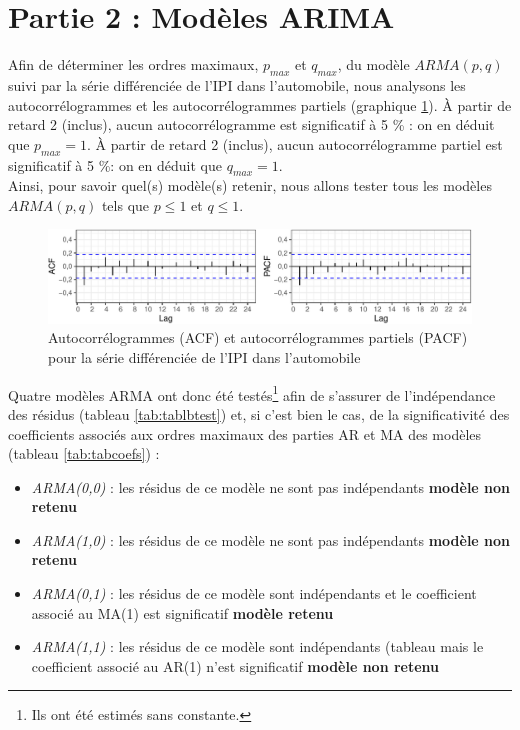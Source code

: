 \documentclass[,french]{article}
\begin{document}
\hypertarget{partie-2-moduxe8les-arima}{%
\section{Partie 2 : Modèles ARIMA}\label{partie-2-moduxe8les-arima}}

Afin de déterminer les ordres maximaux, \(p_{max}\) et \(q_{max}\), du modèle \(ARMA(p,q)\) suivi par la série différenciée de l'IPI dans l'automobile, nous analysons les autocorrélogrammes et les autocorrélogrammes partiels (graphique \ref{fig:acfPacf}).
À partir de retard 2 (inclus), aucun autocorrélogramme est significatif à 5 \% : on en déduit que \(p_{max} = 1\).
À partir de retard 2 (inclus), aucun autocorrélogramme partiel est significatif à 5 \%: on en déduit que \(q_{max} = 1\).\\
Ainsi, pour savoir quel(s) modèle(s) retenir, nous allons tester tous les modèles \(ARMA(p,q)\) tels que \(p\leq 1\) et \(q\leq 1\).

\begin{figure}

{\centering \includegraphics{img/rmd-acfPacf-1} 

}

\caption{Autocorrélogrammes (ACF) et autocorrélogrammes partiels (PACF) pour la série différenciée de l'IPI dans l'automobile}\label{fig:acfPacf}
\end{figure}

Quatre modèles ARMA ont donc été testés\footnote{Ils ont été estimés sans constante.} afin de s'assurer de l'indépendance des résidus (tableau \ref{tab:tablbtest}) et, si c'est bien le cas, de la significativité des coefficients associés aux ordres maximaux des parties AR et MA des modèles (tableau \ref{tab:tabcoefs}) :

\begin{itemize}
\item \emph{ARMA(0,0)} : les résidus de ce modèle ne sont pas indépendants \faArrowCircleRight{} \textbf{modèle non retenu}

\item \emph{ARMA(1,0)} : les résidus de ce modèle ne sont pas indépendants \faArrowCircleRight{} \textbf{modèle non retenu}

\item \emph{ARMA(0,1)} : les résidus de ce modèle sont indépendants et le coefficient associé au MA(1) est significatif \faArrowCircleRight{} \textbf{modèle retenu}

\item \emph{ARMA(1,1)} : les résidus de ce modèle sont indépendants (tableau mais le coefficient associé au AR(1) n'est significatif \faArrowCircleRight{} \textbf{modèle non retenu}
\end{itemize}
\end{document}
